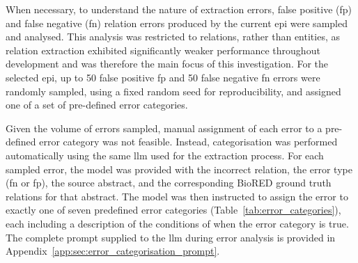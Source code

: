 




When necessary, to understand the nature of extraction errors, false positive (\gls{fp}) and false negative (\gls{fn}) relation errors produced by the current \gls{epi} were sampled and analysed. This analysis was restricted to relations, rather than entities, as relation extraction exhibited significantly weaker performance throughout development and was therefore the main focus of this investigation. For the selected \gls{epi}, up to 50 false positive \gls{fp} and 50 false negative \gls{fn} errors were randomly sampled, using a fixed random seed for reproducibility, and assigned one of a set of pre-defined error categories.

Given the volume of errors sampled, manual assignment of each error to a pre-defined error category was not feasible. Instead, categorisation was performed automatically using the same \gls{llm} used for the extraction process. For each sampled error, the model was provided with the incorrect relation, the error type (\gls{fn} or \gls{fp}), the source abstract, and the corresponding BioRED ground truth relations for that abstract. The model was then instructed to assign the error to exactly one of seven predefined error categories (Table~\ref{tab:error_categories}), each including a description of the conditions of when the error category is true. The complete prompt supplied to the \gls{llm} during error analysis is provided in Appendix~\ref{app:sec:error_categorisation_prompt}.

